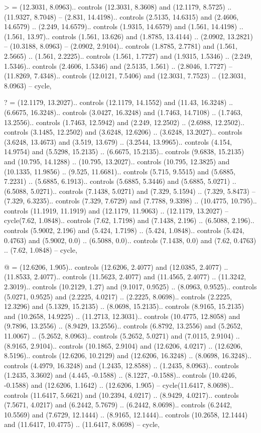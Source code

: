 > = {(12.3031, 8.0963).. controls (12.3031, 8.3608) and (12.1179, 8.5725) .. (11.9327, 8.7048) -- (2.831, 14.4198).. controls (2.5135, 14.6315) and (2.4606, 14.6579) .. (2.249, 14.6579).. controls (1.9315, 14.6579) and (1.561, 14.4198) .. (1.561, 13.97).. controls (1.561, 13.626) and (1.8785, 13.4144) .. (2.0902, 13.2821) -- (10.3188, 8.0963) -- (2.0902, 2.9104).. controls (1.8785, 2.7781) and (1.561, 2.5665) .. (1.561, 2.2225).. controls (1.561, 1.7727) and (1.9315, 1.5346) .. (2.249, 1.5346).. controls (2.4606, 1.5346) and (2.5135, 1.561) .. (2.8046, 1.7727) -- (11.8269, 7.4348).. controls (12.0121, 7.5406) and (12.3031, 7.7523) .. (12.3031, 8.0963) -- cycle},

? = {(12.1179, 13.2027).. controls (12.1179, 14.1552) and (11.43, 16.3248) .. (6.6675, 16.3248).. controls (3.0427, 16.3248) and (1.7463, 14.7108) .. (1.7463, 13.2556).. controls (1.7463, 12.5942) and (2.249, 12.2502) .. (2.6988, 12.2502).. controls (3.1485, 12.2502) and (3.6248, 12.6206) .. (3.6248, 13.2027).. controls (3.6248, 13.4673) and (3.519, 13.679) .. (3.2544, 13.9965).. controls (4.154, 14.9754) and (5.5298, 15.2135) .. (6.6675, 15.2135).. controls (9.6838, 15.2135) and (10.795, 14.1288) .. (10.795, 13.2027).. controls (10.795, 12.3825) and (10.1335, 11.9856) .. (9.525, 11.6681).. controls (5.715, 9.5515) and (5.6885, 7.2231) .. (5.6885, 6.1913).. controls (5.6885, 5.3446) and (5.6885, 5.0271) .. (6.5088, 5.0271).. controls (7.1438, 5.0271) and (7.329, 5.1594) .. (7.329, 5.8473) -- (7.329, 6.3235).. controls (7.329, 7.6729) and (7.7788, 9.3398) .. (10.4775, 10.795).. controls (11.1919, 11.1919) and (12.1179, 11.9063) .. (12.1179, 13.2027) -- cycle(7.62, 1.0848).. controls (7.62, 1.7198) and (7.1438, 2.196) .. (6.5088, 2.196).. controls (5.9002, 2.196) and (5.424, 1.7198) .. (5.424, 1.0848).. controls (5.424, 0.4763) and (5.9002, 0.0) .. (6.5088, 0.0).. controls (7.1438, 0.0) and (7.62, 0.4763) .. (7.62, 1.0848) -- cycle},

@ = {(12.6206, 1.905).. controls (12.6206, 2.4077) and (12.0385, 2.4077) .. (11.8533, 2.4077).. controls (11.5623, 2.4077) and (11.4565, 2.4077) .. (11.3242, 2.3019).. controls (10.2129, 1.27) and (9.1017, 0.9525) .. (8.0963, 0.9525).. controls (5.0271, 0.9525) and (2.2225, 4.0217) .. (2.2225, 8.0698).. controls (2.2225, 12.3296) and (5.1329, 15.2135) .. (8.0698, 15.2135).. controls (8.9165, 15.2135) and (10.2658, 14.9225) .. (11.2713, 12.3031).. controls (10.4775, 12.8058) and (9.7896, 13.2556) .. (8.9429, 13.2556).. controls (6.8792, 13.2556) and (5.2652, 11.0067) .. (5.2652, 8.0963).. controls (5.2652, 5.0271) and (7.0115, 2.9104) .. (8.9165, 2.9104).. controls (10.1865, 2.9104) and (12.6206, 4.0217) .. (12.6206, 8.5196).. controls (12.6206, 10.2129) and (12.6206, 16.3248) .. (8.0698, 16.3248).. controls (4.4979, 16.3248) and (1.2435, 12.8588) .. (1.2435, 8.0963).. controls (1.2435, 3.3602) and (4.445, -0.1588) .. (8.1227, -0.1588).. controls (10.4246, -0.1588) and (12.6206, 1.1642) .. (12.6206, 1.905) -- cycle(11.6417, 8.0698).. controls (11.6417, 5.6621) and (10.2394, 4.0217) .. (8.9429, 4.0217).. controls (7.5671, 4.0217) and (6.2442, 5.7679) .. (6.2442, 8.0698).. controls (6.2442, 10.5569) and (7.6729, 12.1444) .. (8.9165, 12.1444).. controls (10.2658, 12.1444) and (11.6417, 10.4775) .. (11.6417, 8.0698) -- cycle},

